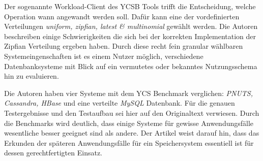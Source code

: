 Der sogenannte Workload-Client des YCSB Tools trifft die Entscheidung, welche Operation wann angewandt werden soll. Dafür kann eine der vordefinierten Verteilungen \textit{uniform, zipfian, latest \& multinomial} gewählt werden. Die Autoren beschreiben einige Schwierigkeiten die sich bei der korrekten Implementation der Zipfian Verteilung ergeben haben. Durch diese recht fein granular wählbaren Systemeingenschaften ist es einem Nutzer möglich, verschiedene Datenbanksysteme mit Blick auf ein vermutetes oder bekanntes Nutzungsschema hin zu evaluieren. 

Die Autoren haben vier Systeme mit dem YCS Benchmark verglichen: \textit{PNUTS, Cassandra, HBase} und eine verteilte \textit{MySQL} Datenbank. Für die genauen Testergebnisse und den Testaufbau sei hier auf den Originaltext verwiesen. Durch die Benchmarks wird deutlich, dass einige Systeme für gewisse Anwendungsfälle wesentliche besser geeignet sind als andere. Der Artikel weist darauf hin, dass das Erkunden der späteren Anwendungsfälle für ein Speichersystem essentiell ist für dessen gerechtfertigten Einsatz.